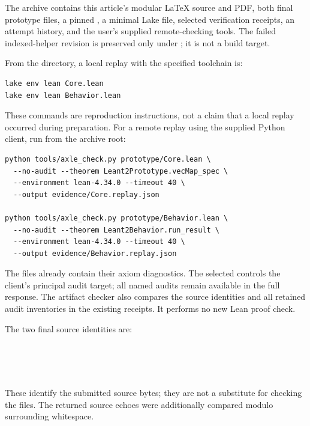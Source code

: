 The archive contains this article's modular LaTeX source and PDF, both final prototype files, a pinned , a minimal Lake file, selected verification receipts, an attempt history, and the user's supplied remote-checking tools. The failed indexed-helper revision is preserved only under ; it is not a build target.

From the  directory, a local replay with the specified toolchain is:
\par\noindent\begin{minipage}{\linewidth}
\begin{lstlisting}[language={}]
lake env lean Core.lean
lake env lean Behavior.lean
\end{lstlisting}
\end{minipage}\par
These commands are reproduction instructions, not a claim that a local replay occurred during preparation. For a remote replay using the supplied Python client, run from the archive root:
\par\noindent\begin{minipage}{\linewidth}
\begin{lstlisting}[language={}]
python tools/axle_check.py prototype/Core.lean \
  --no-audit --theorem Leant2Prototype.vecMap_spec \
  --environment lean-4.34.0 --timeout 40 \
  --output evidence/Core.replay.json

python tools/axle_check.py prototype/Behavior.lean \
  --no-audit --theorem Leant2Behavior.run_result \
  --environment lean-4.34.0 --timeout 40 \
  --output evidence/Behavior.replay.json
\end{lstlisting}
\end{minipage}\par
The files already contain their axiom diagnostics. The selected  controls the client's principal audit target; all named audits remain available in the full response. The artifact checker also compares the source identities and all retained audit inventories in the existing receipts. It performs no new Lean proof check.

The two final source identities are:
\begin{center}\footnotesize
\code{Core.lean}\\
\\[4pt]
\code{Behavior.lean}\\
\end{center}
These identify the submitted source bytes; they are not a substitute for checking the files. The returned source echoes were additionally compared modulo surrounding whitespace.

